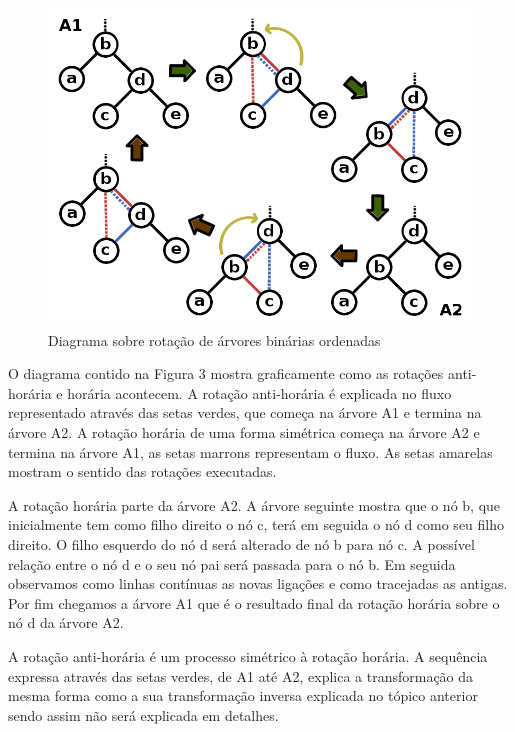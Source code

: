 \begin{figure}[H]
	\caption{\label{gram_cls}Diagrama sobre rotação de árvores binárias ordenadas}
	\begin{center}
	    \includegraphics[scale=0.25]{tree_rotations.png}
	\end{center}
\end{figure}

O diagrama contido na Figura 3 mostra graficamente como as rotações anti-horária e horária acontecem. A rotação anti-horária é explicada no fluxo representado através das setas verdes, que começa na árvore A1 e termina na árvore A2. A rotação horária de uma forma simétrica começa na árvore A2 e termina na árvore A1, as setas marrons representam o fluxo. As setas amarelas mostram o sentido das rotações executadas.

A rotação horária parte da árvore A2. A árvore seguinte mostra que o nó b, que inicialmente tem como filho direito o nó c, terá em seguida o nó d como seu filho direito. O filho esquerdo do nó d será alterado de nó b para nó c. A possível relação entre o nó d e o seu nó pai será passada para o nó b. Em seguida observamos como linhas contínuas as novas ligações e como tracejadas as antigas. Por fim chegamos a árvore A1 que é o resultado final da rotação horária sobre o nó d da árvore A2.

A rotação anti-horária é um processo simétrico à rotação horária. A sequência expressa através das setas verdes, de A1 até A2, explica a transformação da mesma forma como a sua transformação inversa explicada no tópico anterior sendo assim não será explicada em detalhes.


